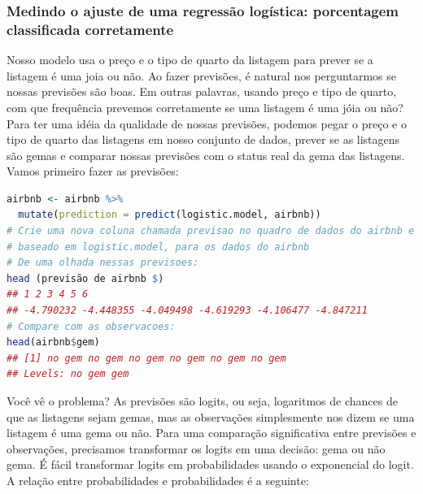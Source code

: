 \documentclass{article}
\begin{document}
\subsubsection{Medindo o ajuste de uma regressão logística: porcentagem classificada corretamente}

Nosso modelo usa o preço e o tipo de quarto da listagem para prever se a listagem é uma joia ou não. Ao fazer previsões, é natural nos perguntarmos se nossas previsões são boas. Em outras palavras, usando preço e tipo de quarto, com que frequência prevemos corretamente se uma listagem é uma jóia ou não? Para ter uma idéia da qualidade de nossas previsões, podemos pegar o preço e o tipo de quarto das listagens em nosso conjunto de dados, prever se as listagens são gemas e comparar nossas previsões com o status real da gema das listagens. Vamos primeiro fazer as previsões:

\begin{lstlisting}[language=R]
airbnb <- airbnb %>% 
  mutate(prediction = predict(logistic.model, airbnb))
# Crie uma nova coluna chamada previsao no quadro de dados do airbnb e armazene nela a previsao,
# baseado em logistic.model, para os dados do airbnb
# De uma olhada nessas previsoes:
head (previsão de airbnb $)
## 1 2 3 4 5 6
## -4.790232 -4.448355 -4.049498 -4.619293 -4.106477 -4.847211
# Compare com as observacoes:
head(airbnb$gem)
## [1] no gem no gem no gem no gem no gem no gem
## Levels: no gem gem
\end{lstlisting}

Você vê o problema? As previsões são logits, ou seja, logaritmos de chances de que as listagens sejam gemas, mas as observações simplesmente nos dizem se uma listagem é uma gema ou não. Para uma comparação significativa entre previsões e observações, precisamos transformar os logits em uma decisão: gema ou não gema. É fácil transformar logits em probabilidades usando o exponencial do logit. A relação entre probabilidades e probabilidades é a seguinte:
\end{document}

